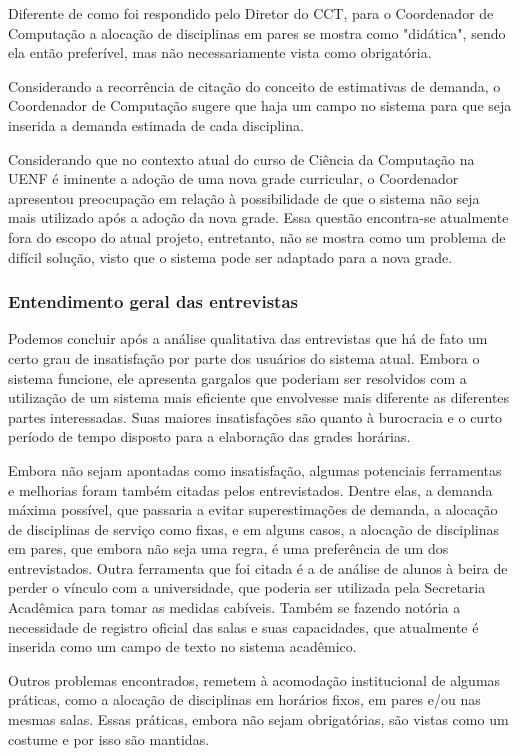 Diferente de como foi respondido pelo Diretor do CCT, para o Coordenador de Computação a alocação de disciplinas em pares se mostra como "didática", sendo ela então preferível, mas não necessariamente vista como obrigatória.

Considerando a recorrência de citação do conceito de estimativas de demanda, o Coordenador de Computação sugere que haja um campo no sistema para que seja inserida a demanda estimada de cada disciplina.

Considerando que no contexto atual do curso de Ciência da Computação na UENF é iminente a adoção de uma nova grade curricular, o Coordenador apresentou preocupação em relação à possibilidade de que o sistema não seja mais utilizado após a adoção da nova grade. Essa questão encontra-se atualmente fora do escopo do atual projeto, entretanto, não se mostra como um problema de difícil solução, visto que o sistema pode ser adaptado para a nova grade.

\subsubsection{Entendimento geral das entrevistas} %

Podemos concluir após a análise qualitativa das entrevistas que há de fato um certo grau de insatisfação por parte dos usuários do sistema atual. Embora o sistema funcione, ele apresenta gargalos que poderiam ser resolvidos com a utilização de um sistema mais eficiente que envolvesse mais diferente as diferentes partes interessadas. Suas maiores insatisfações são quanto à burocracia e o curto período de tempo disposto para a elaboração das grades horárias.

Embora não sejam apontadas como insatisfação, algumas potenciais ferramentas e melhorias foram também citadas pelos entrevistados. Dentre elas, a demanda máxima possível, que passaria a evitar superestimações de demanda, a alocação de disciplinas de serviço como fixas, e em alguns casos, a alocação de disciplinas em pares, que embora não seja uma regra, é uma preferência de um dos entrevistados. Outra ferramenta que foi citada é a de análise de alunos à beira de perder o vínculo com a universidade, que poderia ser utilizada pela Secretaria Acadêmica para tomar as medidas cabíveis. Também se fazendo notória a necessidade de registro oficial das salas e suas capacidades, que atualmente é inserida como um campo de texto no sistema acadêmico.

Outros problemas encontrados, remetem à acomodação institucional de algumas práticas, como a alocação de disciplinas em horários fixos, em pares e/ou nas mesmas salas. Essas práticas, embora não sejam obrigatórias, são vistas como um costume e por isso são mantidas.

